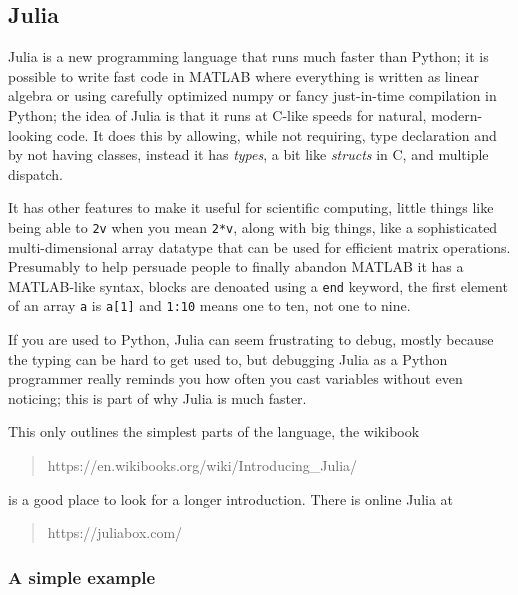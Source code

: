 \documentclass[11pt,a4paper]{scrartcl}
\begin{document}
\subsection*{Julia}
\lstset{language=python}
Julia is a new programming language that runs much faster than Python;
it is possible to write fast code in MATLAB where everything is
written as linear algebra or using carefully optimized numpy or fancy
just-in-time compilation in Python; the idea of Julia is that it runs
at C-like speeds for natural, modern-looking code. It does this by
allowing, while not requiring, type declaration and by not having
classes, instead it has \textsl{types}, a bit like \textsl{structs} in
C, and multiple dispatch. 

It has other features to make it useful for scientific computing,
little things like being able to \texttt{2v} when you mean
\texttt{2*v}, along with big things, like a sophisticated
multi-dimensional array datatype that can be used for efficient matrix
operations. Presumably to help persuade people to finally abandon
MATLAB it has a MATLAB-like syntax, blocks are denoated using a
\texttt{end} keyword, the first element of an array \texttt{a} is
\texttt{a[1]} and \texttt{1:10} means one to ten, not one to nine.

If you are used to Python, Julia can seem frustrating to debug, mostly
because the typing can be hard to get used to, but debugging Julia as
a Python programmer really reminds you how often you cast variables
without even noticing; this is part of why Julia is much faster.

This only outlines the simplest parts of the language, the wikibook
\begin{quote}
https://en.wikibooks.org/wiki/Introducing\_Julia/
\end{quote}
is a good place to look for a longer introduction. There is online Julia at
\begin{quote}
https://juliabox.com/
\end{quote}

\subsubsection*{A simple example}
\end{document}
